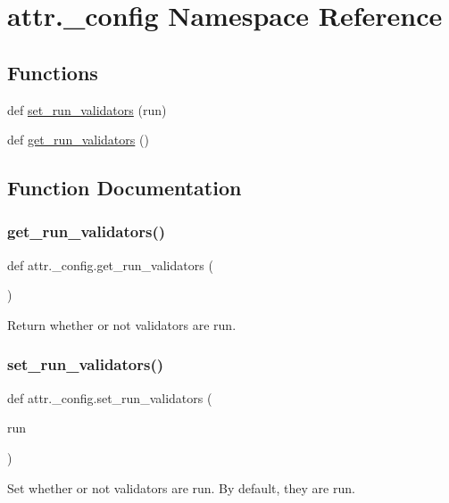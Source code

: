 \hypertarget{namespaceattr_1_1__config}{}\section{attr.\+\_\+config Namespace Reference}
\label{namespaceattr_1_1__config}
\subsection*{Functions}
\begin{DoxyCompactItemize}
\item 
def \hyperlink{namespaceattr_1_1__config_abe961a95c28704edbe4eb745d68e96b3}{set\+\_\+run\+\_\+validators} (run)
\item 
def \hyperlink{namespaceattr_1_1__config_a76c264068d10f0513cba41680c537b57}{get\+\_\+run\+\_\+validators} ()
\end{DoxyCompactItemize}


\subsection{Function Documentation}
\mbox{\label{namespaceattr_1_1__config_a76c264068d10f0513cba41680c537b57}} 
\subsubsection{\texorpdfstring{get\+\_\+run\+\_\+validators()}{get\_run\_validators()}}
{\footnotesize\ttfamily def attr.\+\_\+config.\+get\+\_\+run\+\_\+validators (\begin{DoxyParamCaption}{ }\end{DoxyParamCaption})}

\begin{DoxyVerb}Return whether or not validators are run.
\end{DoxyVerb}
 \mbox{\label{namespaceattr_1_1__config_abe961a95c28704edbe4eb745d68e96b3}} 
\subsubsection{\texorpdfstring{set\+\_\+run\+\_\+validators()}{set\_run\_validators()}}
{\footnotesize\ttfamily def attr.\+\_\+config.\+set\+\_\+run\+\_\+validators (\begin{DoxyParamCaption}\item[{}]{run }\end{DoxyParamCaption})}

\begin{DoxyVerb}Set whether or not validators are run.  By default, they are run.
\end{DoxyVerb}
 